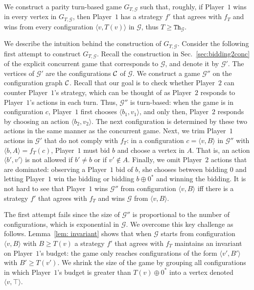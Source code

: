 \documentclass{article}\providecommand{\nequiv}{\not\equiv}\usepackage[a4paper,margin=20mm]{geometry}
\newcommand{\PO}{Player~$1$\xspace}
\newcommand{\PT}{Player~$2$\xspace}
\newcommand{\C}{{\cal C}}
\newcommand{\G}{{\mathcal G}}
\newcommand{\thresh}{\texttt{Th}\xspace}
\newcommand{\zug}[1]{\langle #1  \rangle}
\newcommand{\succb}[1]{#1 \oplus 0^*\xspace}
\begin{document}
We construct a parity turn-based game $G_{T, \G}$ such that, roughly, if \PO wins in every vertex in $G_{T, \G}$, then \PO has a strategy $f'$ that agrees with $f_T$ and wins from every configuration $\zug{v, T(v)}$ in $\G$, thus $T \geq \thresh_\G$. 

We describe the intuition behind the construction of $G_{T, \G}$. Consider the following first attempt to construct $G_{T, \G}$. 
Recall the construction in Sec.~\ref{sec:bidding2conc} of the explicit concurrent game that corresponds to $\G$, and denote it by $\G'$. The vertices of $\G'$ are the configurations $\C$ of $\G$. We construct a game $\G''$ on the configuration graph $\C$. 
Recall that our goal is to check whether \PT can counter \PO's strategy, which can be thought of as \PT responds to \PO's actions in each turn. Thus, $\G''$ is turn-based: when the game is in configuration $c$, \PO first chooses $\zug{b_1, v_1}$, and only then, \PT responds by choosing an action $\zug{b_2, v_2}$. The next configuration is determined by these two actions in the same manner as the concurrent game. 
Next, we trim \PO actions in $\G'$ that do not comply with $f_T$: in a configuration $c = \zug{v, B}$ in $\G''$ with $\zug{b, A} = f_T(c)$, \PO must bid $b$ and choose a vertex in $A$. That is, an action $\zug{b', v'}$ is not allowed if $b' \neq b$ or if $v' \notin A$. Finally, we omit \PT actions that are dominated: observing a \PO bid of $b$, she chooses between bidding $0$ and letting \PO win the bidding or bidding $\succb{b}$ and winning the bidding. 
It is not hard to see that \PO wins $\G''$ from configuration $\zug{v, B}$ iff there is a strategy $f'$ that agrees with $f_T$ and wins $\G$ from $\zug{v, B}$.

The first attempt fails since the size of $\G''$ is proportional to the number of configurations, which is exponential in $\G$. 
We overcome this key challenge as follows. 
Lemma~\ref{lem: invariant} shows that when $\G$ starts from configuration $\zug{v, B}$ with $B \geq T(v)$ a strategy $f'$ that agrees with $f_T$ maintains an invariant on \PO's budget: the game only reaches configurations of the form $\zug{v', B'}$ with $B' \geq T(v')$. 
We shrink the size of the game by grouping all configurations in which \PO's budget is greater than $\succb{T(v)}$ into a vertex denoted $\zug{v, \top}$. 
\end{document}
